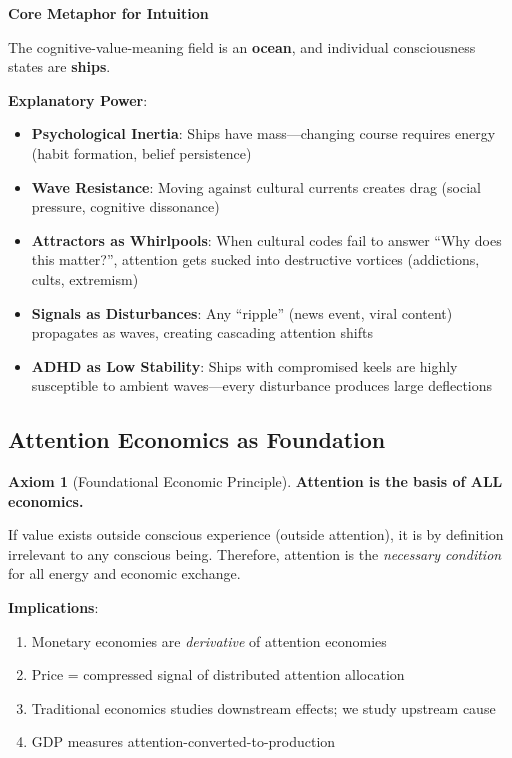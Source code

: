 \documentclass[11pt,a4paper]{article}
\theoremstyle{definition}
\newtheorem{axiom}{Axiom}[section]
\theoremstyle{remark}
\begin{document}
\begin{mdframed}[backgroundcolor=cyan!5,linewidth=2pt]
\textbf{Core Metaphor for Intuition}

The cognitive-value-meaning field is an \textbf{ocean}, and individual consciousness states are \textbf{ships}.

\textbf{Explanatory Power}:
\begin{itemize}
\item \textbf{Psychological Inertia}: Ships have mass—changing course requires energy (habit formation, belief persistence)
\item \textbf{Wave Resistance}: Moving against cultural currents creates drag (social pressure, cognitive dissonance)
\item \textbf{Attractors as Whirlpools}: When cultural codes fail to answer ``Why does this matter?'', attention gets sucked into destructive vortices (addictions, cults, extremism)
\item \textbf{Signals as Disturbances}: Any ``ripple'' (news event, viral content) propagates as waves, creating cascading attention shifts
\item \textbf{ADHD as Low Stability}: Ships with compromised keels are highly susceptible to ambient waves—every disturbance produces large deflections
\end{itemize}
\end{mdframed}

\subsection{Attention Economics as Foundation}

\begin{axiom}[Foundational Economic Principle]
\textbf{Attention is the basis of ALL economics.}

If value exists outside conscious experience (outside attention), it is by definition irrelevant to any conscious being. Therefore, attention is the \textit{necessary condition} for all energy and economic exchange.

\textbf{Implications}:
\begin{enumerate}
\item Monetary economies are \textit{derivative} of attention economies
\item Price = compressed signal of distributed attention allocation
\item Traditional economics studies downstream effects; we study upstream cause
\item GDP measures attention-converted-to-production
\end{enumerate}
\end{axiom}
\end{document}
